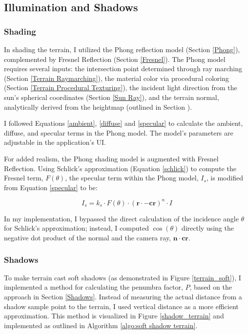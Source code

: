 \subsection{Illumination and Shadows}

\subsubsection{Shading}
\label{Terrain Shading}

In shading the terrain, I utilized the Phong reflection model (Section \ref{Phong}), complemented by Fresnel Reflection (Section \ref{Fresnel}). The Phong model requires several inputs: the intersection point determined through ray marching (Section \ref{Terrain Raymarching}), the material color via procedural coloring (Section \ref{Terrain Procedural Texturing}), the incident light direction from the sun's spherical coordinates (Section \ref{Sun Ray}), and the terrain normal, analytically derived from the heightmap (outlined in Section ).

I followed Equations \ref{ambient}, \ref{diffuse} and \ref{specular} to calculate the ambient, diffuse, and specular terms in the Phong model. The model's parameters are adjustable in the application's UI.

For added realism, the Phong shading model is augmented with Fresnel Reflection. Using Schlick's approximation (Equation \ref{schlick}) to compute the Fresnel term, $F(\theta)$, the specular term within the Phong model, $I_s$, is modified from Equation \ref{specular} to be:

\begin{equation}
I_{s} = k_s \cdot F(\theta) \cdot (\mathbf{r} \cdot \mathbf{-cr})^n \cdot I
\end{equation}

In my implementation, I bypassed the direct calculation of the incidence angle $\theta$ for Schlick's approximation; instead, I computed $\cos(\theta)$ directly using the negative dot product of the normal and the camera ray, $\mathbf{n} \cdot \mathbf{cr}$.

\subsubsection{Shadows}
\label{Terrain Shadows}

To make terrain cast soft shadows (as demonstrated in Figure \ref{terrain_soft}), I implemented a method for calculating the penumbra factor, $P$, based on the approach in Section \ref{Shadows}. Instead of measuring the actual distance from a shadow sample point to the terrain, I used vertical distance as a more efficient approximation. This method is visualized in Figure \ref{shadow_terrain} and implemented as outlined in Algorithm \ref{algo:soft shadow terrain}.

